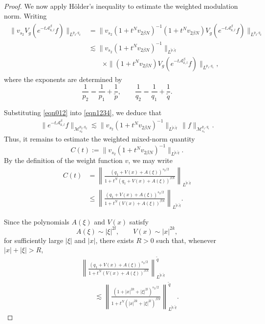 \documentclass[12pt,reqno,a4paper]{amsart}
\numberwithin{equation}{section}
\theoremstyle{plain}
\theoremstyle{definition}
\theoremstyle{remark}
\begin{document}
\begin{proof}
We now apply Hölder's inequality to estimate the weighted modulation norm. Writing
\begin{align}
\label{eqn1234}
\begin{aligned}
\|v_{s_{2}}
V_{g}(e^{-t\mathcal{A}_{k,l}^{\beta}}f)\|_{L^{p_{2},q_{2}}}
&=
\|v_{s_{2}}
(1+t^{N}v_{2\beta N})^{-1}
(1+t^{N}v_{2\beta N})
V_{g}(e^{-t\mathcal{A}_{k,l}^{\beta}}f)\|_{L^{p_{2},q_{2}}}
\\
&\lesssim
\|v_{s_{2}}
(1+t^{N}v_{2\beta N})^{-1}\|_{L^{\widetilde{p},\widetilde{q}}}
\\
&\qquad \times
\|(1+t^{N}v_{2\beta N})
V_{g}(e^{-t\mathcal{A}_{k,l}^{\beta}}f)\|_{L^{p_{1},q_{1}}},
\end{aligned}
\end{align}
where the exponents are determined by
\[
\frac{1}{p_{2}}
=
\frac{1}{p_{1}}
+
\frac{1}{\widetilde{p}},
\qquad
\frac{1}{q_{2}}
=
\frac{1}{q_{1}}
+
\frac{1}{\widetilde{q}}.
\]

Substituting \eqref{eqn012} into \eqref{eqn1234}, we deduce that
\begin{align}
\label{beforeenequality}
\|e^{-t\mathcal{A}_{k,l}^{\beta}}f\|_{\mathcal{M}^{p_{2},q_{2}}_{s_{2}}}
\lesssim
\|v_{s_{2}}
(1+t^{N}v_{2\beta N})^{-1}\|_{L^{\widetilde{p},\widetilde{q}}}
\,
\|f\|_{\mathcal{M}^{p_{1},q_{1}}_{s_{1}}}.
\end{align}
Thus, it remains to estimate the weighted mixed-norm quantity
\[
C(t)
:=
\|v_{s_{2}}
(1+t^{N}v_{2\beta N})^{-1}\|_{L^{\widetilde{p},\widetilde{q}}}.
\]
By the definition of the weight function $v$, we may write
\begin{align*}
C(t)
&=
\left\|
\frac{(q_{1}+V(x)+A(\xi))^{s_{2}/2}}
{1+t^{N}(q_{1}+V(x)+A(\xi))^{\beta N}}
\right\|_{L^{\widetilde{p},\widetilde{q}}}
\\
&\leq
\left\|
\frac{(q_{1}+V(x)+A(\xi))^{s_{2}/2}}
{1+t^{N}(V(x)+A(\xi))^{\beta N}}
\right\|_{L^{\widetilde{p},\widetilde{q}}}.
\end{align*}

Since the polynomials $A(\xi)$ and $V(x)$ satisfy
\[
A(\xi)\sim |\xi|^{2l},
\qquad
V(x)\sim |x|^{2k},
\]
for sufficiently large $|\xi|$ and $|x|$, there exists $R>0$ such that, whenever $|x|+|\xi|>R$,
\begin{align*}
&\left\|
\frac{(q_{1}+V(x)+A(\xi))^{s_{2}/2}}
{1+t^{N}(V(x)+A(\xi))^{\beta N}}
\right\|_{L^{\widetilde{p},\widetilde{q}}}^{\widetilde{q}}
\\
&\qquad\lesssim
\left\|
\frac{(1+|x|^{2k}+|\xi|^{2l})^{s_{2}/2}}
{1+t^{N}(|x|^{2k}+|\xi|^{2l})^{\beta N}}
\right\|_{L^{\widetilde{p},\widetilde{q}}}^{\widetilde{q}}.
\end{align*}


\end{proof}
\end{document}
